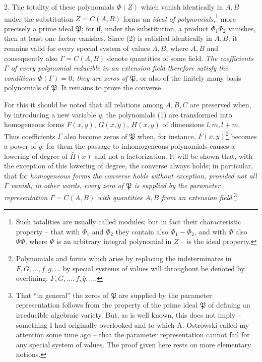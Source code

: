 \documentclass[11pt]{article}
\begin{document}
2. The totality of these polynomials $\Phi(Z)$ which vanish identically in $A,B$ under the substitution $Z=C(A,B)$ forms an \emph{ideal of polynomials},\footnote{Such totalities are usually called modules; but in fact their characteristic property -- that with $\Phi_1$ and $\Phi_2$ they contain also $\Phi_1-\Phi_2$, and with $\Phi$ also $\Psi\Phi$, where $\Psi$ is an arbitrary integral polynomial in $Z$ -- is the ideal property.} more precisely a prime ideal $\mathfrak P$; for if, under the substitution, a product $\Phi_1\Phi_2$ vanishes, then at least one factor vanishes. Since (2) is satisfied identically in $A,B$, it remains valid for every special system of values $A,B$, where $A,B$ and consequently also $\Gamma=C(A,B)$ denote quantities of some field. \emph{The coefficients $\Gamma$ of every polynomial reducible in an extension field therefore satisfy the conditions $\Phi(\Gamma)=0$; they are zeros of $\mathfrak P$,} or also of the finitely many basis polynomials of $\mathfrak P$. It remains to prove the converse.

For this it should be noted that all relations among $A,B,C$ are preserved when, by introducing a new variable $y$, the polynomials (1) are transformed into homogeneous forms $F(x,y)$, $G(x,y)$, $H(x,y)$ of dimensions $l,m,l+m$. Thus coefficients $\Gamma$ also become zeros of $\mathfrak P$ when, for instance, $F(x,y)$\footnote{Polynomials and forms which arise by replacing the indeterminates in $F,G,\ldots,f,g,\ldots$ by special systems of values will throughout be denoted by overlining: $\bar F,\bar G,\ldots,\bar f,\bar g,\ldots$.} becomes a power of $y$; for them the passage to inhomogeneous polynomials causes a lowering of degree of $\bar H(x)$ and not a factorization. It will be shown that, with the exception of this lowering of degree, the converse always holds; in particular, that for \emph{homogeneous forms the converse holds without exception, provided not all $\Gamma$ vanish; in other words, every zero of $\mathfrak P$ is supplied by the parameter representation $\Gamma=C(A,B)$ with quantities $A,B$ from an extension field}.\footnote{That ``in general'' the zeros of $\mathfrak P$ are supplied by the parameter representation follows from the property of the prime ideal $\mathfrak P$ of defining an irreducible algebraic variety. But, as is well known, this does not imply -- something I had originally overlooked and to which A. Ostrowski called my attention some time ago -- that the parameter representation cannot fail for any special system of values. The proof given here rests on more elementary notions.}
\end{document}
